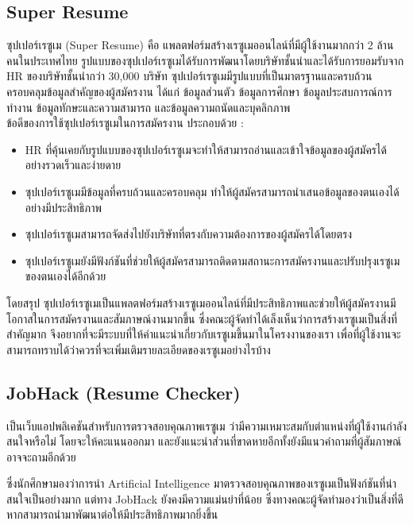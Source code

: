 \subsection{Super Resume}
ซุปเปอร์เรซูเม (Super Resume) คือ แพลตฟอร์มสร้างเรซูเมออนไลน์ที่มีผู้ใช้งานมากกว่า 2 ล้านคนในประเทศไทย
รูปแบบของซุปเปอร์เรซูเมได้รับการพัฒนาโดยบริษัทชั้นนำและได้รับการยอมรับจาก HR ของบริษัทชั้นนำกว่า 30,000 บริษัท ซุปเปอร์เรซูเมมีรูปแบบที่เป็นมาตรฐานและครบถ้วน
ครอบคลุมข้อมูลสำคัญของผู้สมัครงาน ได้แก่ ข้อมูลส่วนตัว ข้อมูลการศึกษา ข้อมูลประสบการณ์การทำงาน ข้อมูลทักษะและความสามารถ และข้อมูลความถนัดและบุคลิกภาพ \\
ข้อดีของการใช้ซุปเปอร์เรซูเมในการสมัครงาน ประกอบด้วย :
\begin{itemize}
      \item HR ที่คุ้นเคยกับรูปแบบของซุปเปอร์เรซูเมจะทำให้สามารถอ่านและเข้าใจข้อมูลของผู้สมัครได้อย่างรวดเร็วและง่ายดาย
      \item ซุปเปอร์เรซูเมมีข้อมูลที่ครบถ้วนและครอบคลุม ทำให้ผู้สมัครสามารถนำเสนอข้อมูลของตนเองได้อย่างมีประสิทธิภาพ
      \item ซุปเปอร์เรซูเมสามารถจัดส่งไปยังบริษัทที่ตรงกับความต้องการของผู้สมัครได้โดยตรง
      \item ซุปเปอร์เรซูเมยังมีฟังก์ชันที่ช่วยให้ผู้สมัครสามารถติดตามสถานะการสมัครงานและปรับปรุงเรซูเมของตนเองได้อีกด้วย
\end{itemize}
\par โดยสรุป ซุปเปอร์เรซูเมเป็นแพลตฟอร์มสร้างเรซูเมออนไลน์ที่มีประสิทธิภาพและช่วยให้ผู้สมัครงานมีโอกาสในการสมัครงานและสัมภาษณ์งานมากขึ้น
ซึ่งคณะผู้จัดทำได้เล็งเห็นว่าการสร้างเรซูเมเป็นสิ่งที่สำคัญมาก จึงอยากที่จะมีระบบที่ให้คำแนะนำเกี่ยวกับเรซูเมขึ้นมาในโครงงานของเรา
เพื่อที่ผู้ใช้งานจะสามารถทราบได้ว่าควรที่จะเพิ่มเติมรายละเอียดของเรซูเมอย่างไรบ้าง

\subsection{JobHack (Resume Checker)}
เป็นเว็บแอปพลิเคชันสำหรับการตรวจสอบคุณภาพเรซูเม ว่ามีความเหมาะสมกับตำแหน่งที่ผู้ใช้งานกำลังสนใจหรือไม่ โดยจะให้คะแนนออกมา
และยังแนะนำส่วนที่ขาดหายอีกทั้งยังมีแนวคำถามที่ผู้สัมภาษณ์อาจจะถามอีกด้วย
\par ซึ่งนักศึกษามองว่าการนำ Artificial Intelligence มาตรวจสอบคุณภาพของเรซูเมเป็นฟังก์ชันที่น่าสนใจเป็นอย่างมาก แต่ทาง JobHack
ยังคงมีความแม่นยำที่น้อย ซึ่งทางคณะผู้จัดทำมองว่าเป็นสิ่งที่ดีหากสามารถนำมาพัฒนาต่อให้มีประสิทธิภาพมากยิ่งขึ้น

